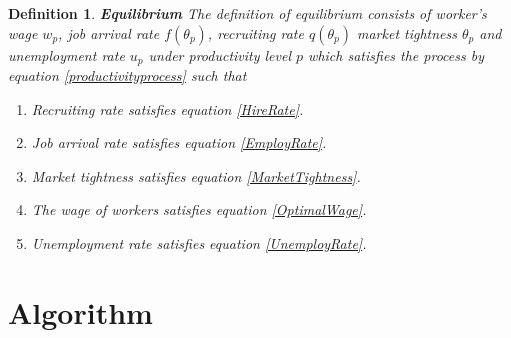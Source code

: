\documentclass[10pt]{article} %
\newtheorem{definition}{Definition}
\begin{document}
    \begin{definition} \textbf{Equilibrium}
        The definition of equilibrium consists of worker's wage \(w_p\), job arrival rate \(f(\theta_p)\), recruiting rate \(q(\theta_p)\) market tightness \(\theta_p\) and unemployment rate \(u_p\) under productivity level \(p\) which satisfies the process by equation \ref{productivityprocess} such that
            \begin{enumerate}
                \item Recruiting rate satisfies equation \ref{HireRate}.
                \item Job arrival rate satisfies equation \ref{EmployRate}.
                \item Market tightness satisfies equation \ref{MarketTightness}.
                \item The wage of workers satisfies equation \ref{OptimalWage}.
                \item Unemployment rate satisfies equation \ref{UnemployRate}.
            \end{enumerate}

    \end{definition}
\section{Algorithm}
\end{document}

